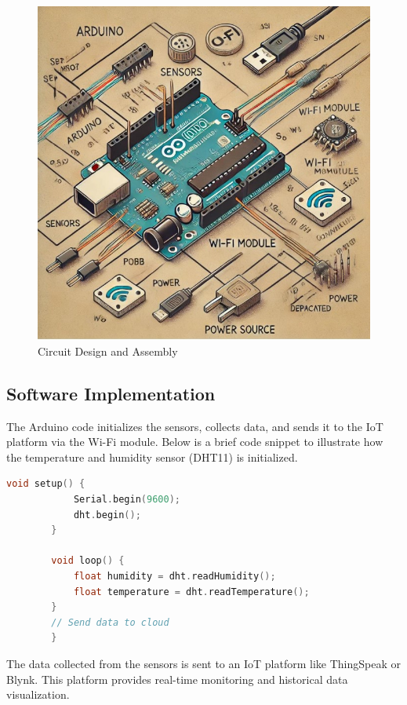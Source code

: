 \documentclass[12pt]{report}
\begin{document}
	
	\begin{figure}[ht]
		\centering
		\includegraphics[scale=1]{circuitdesign.jpg}
		\caption[circuit_design]{Circuit Design and Assembly}
		\label{circuit_design}
	\end{figure}
	
	\subsection{Software Implementation}
	The Arduino code initializes the sensors, collects data, and sends it to the IoT platform via
	the Wi-Fi module. Below is a brief code snippet to illustrate how the temperature and
	humidity sensor (DHT11) is initialized.
	
	
	\par
	\noindent
	\begin{lstlisting}[language=C++, caption={DHT11 Code}]
		void setup() {
			Serial.begin(9600);
			dht.begin();
		}
		
		void loop() {
			float humidity = dht.readHumidity();
			float temperature = dht.readTemperature();
		}
		// Send data to cloud
		}
	\end{lstlisting}
	
	
	
	The data collected from the sensors is sent to an IoT platform like ThingSpeak or Blynk. This platform provides real-time monitoring and historical data visualization.\\
	
\end{document}

